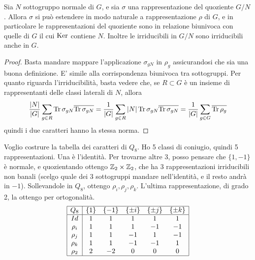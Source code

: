 		\begin{myprop}
			Sia $N$ sottogruppo normale di $G$, e sia $\sigma$ una rappresentazione del quoziente $G/N$. Allora $\sigma$ si può estendere in modo naturale a rappresentazione $\rho$ di $G$, e in particolare le rappresentazioni del quoziente sono in relazione biunivoca con quelle di $G$ il cui $\operatorname{Ker}$ contiene $N$. Inoltre le irriducibili in $G/N$ sono irriducibili anche in $G$.
		\end{myprop}
		\begin{proof}
			Basta mandare mappare l'applicazione $\sigma_{gN}$ in $\rho_g$ assicurandosi che sia una buona definizione. E' simile alla corrispondenza biunivoca tra sottogruppi.
			Per quanto riguarda l'irriducibilità, basta vedere che, se $R\subset G$ è un insieme di rappresentanti delle classi laterali di $N$, allora 
			\[
				\frac{\left|N\right|}{\left|G\right|} \sum_{g\in R}\operatorname{Tr} \sigma_{gN}\overline{\operatorname{Tr} \sigma_{gN}} = \frac1{\left|G\right|} \sum_{g\in R} \left|N\right| \operatorname{Tr} \sigma_{gN}\overline{\operatorname{Tr} \sigma_{gN}} = \frac1{\left|G\right|} \sum_{g\in G} \overline{\operatorname{Tr} \rho_{g}}
			\]
			quindi i due caratteri hanno la stessa norma.
		\end{proof}
		
		\begin{myexample} 
		Voglio costrure la tabella dei caratteri di $Q_8$. Ho 5 classi di coniugio, quindi 5 rappresentazioni. Una è l'identità. Per trovarne altre 3, posso pensare che $\{1,-1\}$ è normale, e quozientando ottengo $\mathbb Z_2 \times \mathbb Z_2$, che ha 3 rappresentazioni irriducibili non banali (scelgo quale dei 3 sottogruppi mandare nell'identità, e il resto andrà in $-1$). Sollevandole in $Q_8$, ottengo $\rho_i,\rho_j,\rho_k$. L'ultima rappresentazione, di grado 2, la ottengo per ortogonalità.
		\[
			\begin{array}{|c|ccccc|}
			\hline
			Q_8    & \{1\} & \{-1\} & \{\pm i\} & \{\pm j\} & \{\pm k\} \\ \hline
			Id     &   1   &    1   &     1     &     1     &     1     \\ 
			\rho_i &   1   &    1   &     1     &    -1     &    -1     \\
			\rho_j &   1   &    1   &    -1     &     1     &    -1     \\
			\rho_k &   1   &    1   &    -1     &    -1     &     1     \\
			\rho_2 &   2   &   -2   &     0     &     0     &     0     \\ \hline
			\end{array}
		\]
		
		
		\end{myexample}


